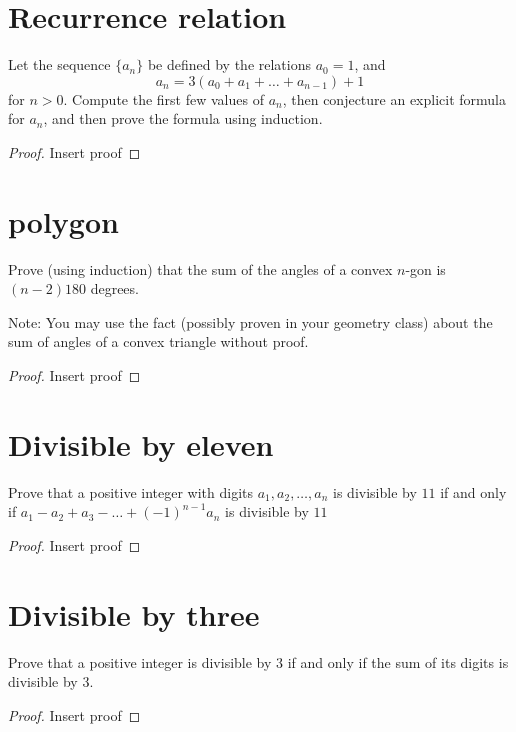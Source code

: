 \documentclass[12pt]{amsart}
\begin{document}
\section{Recurrence relation}
Let the sequence $\{ a_n\}$ be defined by the relations $a_0=1$, and 
\[
a_n = 3(a_0 + a_1 + \dots + a_{n-1}) + 1
\]
for $n>0$. 
Compute the first few values of $a_n$, then conjecture an explicit formula for $a_n$, and then prove the formula using induction.


\begin{proof}
Insert proof
\end{proof}

\section{polygon}
Prove (using induction) that the sum of the angles of a convex $n$-gon is $(n-2)180$ degrees.

Note: You may use the fact (possibly proven in your geometry class) about the sum of angles of a convex triangle without proof.
\begin{proof}
Insert proof
\end{proof}

\section{Divisible by eleven}
Prove that a positive integer with digits $a_1, a_2, \dots, a_n$ is divisible by $11$ if and only if $a_1 - a_2 + a_3 - \dots + (-1)^{n-1} a_n$ is divisible by $11$

\begin{proof}
Insert proof
\end{proof}


\section{Divisible by three}
Prove that a positive integer is divisible by $3$ if and only if the sum of its digits is divisible by $3$.

\begin{proof}
Insert proof
\end{proof}
\end{document}
